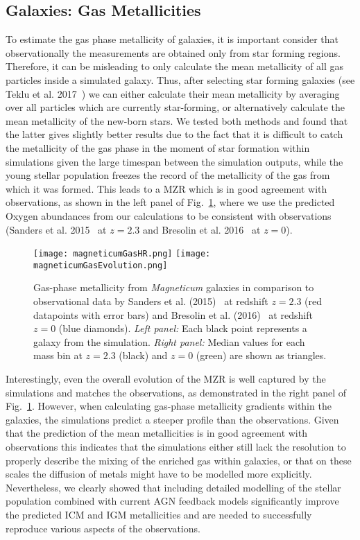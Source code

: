 \documentclass[galaxies,letter,accept,moreauthors,pdftex,10pt,a4paper,usenatbib]{mdpi}
\begin{document}
\subsection{Galaxies: Gas Metallicities}
To estimate the gas phase metallicity of galaxies, it is important
consider that observationally the measurements are obtained only from
star forming regions. Therefore, it can be misleading to only
calculate the mean metallicity of all gas particles inside a simulated
galaxy. Thus, after selecting star forming galaxies (see Teklu et al.
2017~\cite{2017arXiv170206546T}) we can either calculate their mean
metallicity by averaging over all particles which are currently
star-forming, or alternatively calculate the mean metallicity of the
new-born stars.  We tested both methods and found that the latter
gives slightly better results due to the fact that it is difficult to
catch the metallicity of the gas phase in the moment of star formation
within simulations given the large timespan between the simulation
outputs, while the young stellar population freezes the record of the
metallicity of the gas from which it was formed. This leads to a MZR
which is in good agreement with observations, as shown in the left
panel of Fig.~\ref{fig4}, where we use the predicted Oxygen abundances
from our calculations to be consistent with observations (Sanders et
al. 2015~\cite{sanders14} at $z=2.3$ and Bresolin et al.
2016~\cite{bresolin16} at $z=0$).
\begin{figure}[t]
\begin{center}
  \texttt{[image: magneticumGasHR.png]}
  \texttt{[image: magneticumGasEvolution.png]}
  \caption{Gas-phase metallicity from {\it Magneticum} galaxies in
    comparison to observational data by Sanders et al.
    (2015)~\cite{sanders14} at redshift $z=2.3$ (red datapoints with
    error bars) and Bresolin et al. (2016)~\cite{bresolin16} at
    redshift $z=0$ (blue diamonds). \textit{Left panel:} Each black
    point represents a galaxy from the simulation. \textit{Right
      panel:} Median values for each mass bin at $z=2.3$ (black) and
    $z=0$ (green) are shown as triangles.  }
   \label{fig4}
\end{center}
\end{figure}
Interestingly, even the overall evolution of the MZR is well captured
by the simulations and matches the observations, as demonstrated in
the right panel of Fig.~\ref{fig4}. However, when calculating
gas-phase metallicity gradients within the galaxies, the simulations
predict a steeper profile than the observations. Given that the
prediction of the mean metallicities is in good agreement with
observations this indicates that the simulations either still lack the
resolution to properly describe the mixing of the enriched gas within
galaxies, or that on these scales the diffusion of metals might have
to be modelled more explicitly. Nevertheless, we clearly showed that
including detailed modelling of the stellar population combined with
current AGN feedback models significantly improve the predicted ICM
and IGM metallicities and are needed to successfully reproduce various
aspects of the observations.
\end{document}
